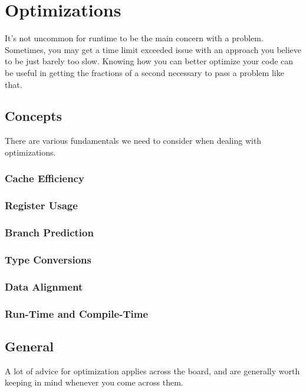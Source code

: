 \section{Optimizations}

It's not uncommon for runtime to be the main concern with a problem. Sometimes, you may get a time limit exceeded issue with an approach you believe to be just barely too slow. Knowing how you can better optimize your code can be useful in getting the fractions of a second necessary to pass a problem like that.

\subsection{Concepts}

There are various fundamentals we need to consider when dealing with optimizations.

\subsubsection{Cache Efficiency}

\subsubsection{Register Usage}

\subsubsection{Branch Prediction}

\subsubsection{Type Conversions}

\subsubsection{Data Alignment}

\subsubsection{Run-Time and Compile-Time}

\subsection{General}

A lot of advice for optimization applies across the board, and are generally worth keeping in mind whenever you come across them.

